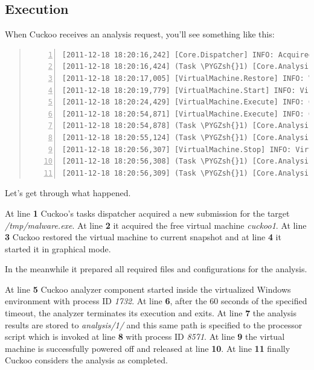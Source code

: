 \documentclass[letterpaper,10pt,english]{sphinxmanual}
\def\PYGZsh{\char`\#}
\begin{document}
\subsection{Execution}
\label{usage/execution:execution}\label{usage/execution::doc}
When Cuckoo receives an analysis request, you'll see something like this:
\begin{quote}

\begin{Verbatim}[commandchars=\\\{\},numbers=left,firstnumber=1,stepnumber=1]
[2011-12-18 18:20:16,242] [Core.Dispatcher] INFO: Acquired analysis task for target "/tmp/malware.exe".
[2011-12-18 18:20:16,424] (Task \PYGZsh{}1) [Core.Analysis.Run] INFO: Acquired virtual machine "cuckoo1".
[2011-12-18 18:20:17,005] [VirtualMachine.Restore] INFO: Virtual machine "Cuckoo1" successfully restored to current snapshot.
[2011-12-18 18:20:19,779] [VirtualMachine.Start] INFO: Virtual machine "Cuckoo1" starting in "gui" mode.
[2011-12-18 18:20:24,429] [VirtualMachine.Execute] INFO: Cuckoo analyzer running with PID 1732 on virtual machine "Cuckoo1".
[2011-12-18 18:20:54,871] [VirtualMachine.Execute] INFO: Cuckoo analyzer exited with code 0 on virtual machine "Cuckoo1".
[2011-12-18 18:20:54,878] (Task \PYGZsh{}1) [Core.Analysis.SaveResults] INFO: Analysis results successfully saved to "analysis/1".
[2011-12-18 18:20:55,124] (Task \PYGZsh{}1) [Core.Analysis.Processing] INFO: Analysis results processor started with PID "8571".
[2011-12-18 18:20:56,307] [VirtualMachine.Stop] INFO: Virtual machine "Cuckoo1" powered off successfully.
[2011-12-18 18:20:56,308] (Task \PYGZsh{}1) [Core.Analysis.FreeVM] INFO: Virtual machine "cuckoo1" released.
[2011-12-18 18:20:56,309] (Task \PYGZsh{}1) [Core.Analysis.Run] INFO: Analyis completed.
\end{Verbatim}
\end{quote}

Let's get through what happened.

At line \textbf{1} Cuckoo's tasks dispatcher acquired a new submission for the target
\emph{/tmp/malware.exe}. At line \textbf{2} it acquired the free virtual machine \emph{cuckoo1}.
At line \textbf{3} Cuckoo restored the virtual machine to current snapshot and at
line \textbf{4} it started it in graphical mode.

In the meanwhile it prepared all required files and configurations for the
analysis.

At line \textbf{5} Cuckoo analyzer component started inside the virtualized Windows
environment with process ID \emph{1732}. At line \textbf{6}, after the 60 seconds of the
specified timeout, the analyzer terminates its execution and exits. At line
\textbf{7} the analysis results are stored to \emph{analysis/1/} and this same path is
specified to the processor script which is invoked at line \textbf{8} with process ID
\emph{8571}. At line \textbf{9} the virtual machine is successfully powered off and
released at line \textbf{10}. At line \textbf{11} finally Cuckoo considers the analysis as
completed.
\end{document}

